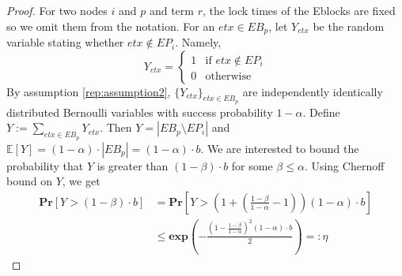   \begin{proof} For two nodes $i$ and $p$ and term $r$, the lock times of the Eblocks are fixed so we omit them from the notation. For an $etx\in EB_p$, let $Y_{etx}$ be the random variable stating whether $etx\notin EP_i$. Namely, 
	 \begin{equation}
    Y_{etx} =
    \begin{cases}
      1  &\mbox{if }  etx\notin EP_i \\
      0  &\mbox{otherwise}
    \end{cases}
  \end{equation}
  By assumption \ref{rep:assumption2}, $\{Y_{etx}\}_{etx\in EB_p}$ are independently identically distributed Bernoulli variables with success probability $1-\alpha$. Define $Y:=\sum_{etx\in EB_p} Y_{etx}$. Then $Y=|EB_p\setminus EP_i|$ and $\mathbb{E}[Y]=(1-\alpha)\cdot|EB_p|=(1-\alpha)\cdot b$. We are interested to bound the probability that $Y$ is greater than $(1-\beta)\cdot b$ for some $\beta\leq \alpha$. Using Chernoff bound on $Y$, we get
 \begin{equation}\begin{split}\label{eq:rep_chernoff}
 \textbf{Pr}\left[Y>(1-\beta) \cdot b\right]&=\textbf{Pr}\left[Y>\left(1+\left(\frac{1-\beta}{1-\alpha}-1\right)\right)(1-\alpha)\cdot  b\right]\\
 &\leq \textbf{exp}\left(-\frac{\left(1-\frac{1-\beta}{1-\alpha}\right)^2(1-\alpha) \cdot b}{2}\right)=:\eta 
\end{split} \end{equation}


\end{proof}
